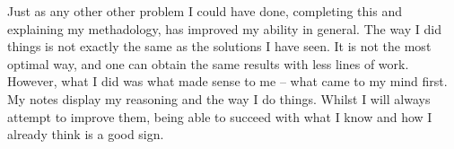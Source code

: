 \documentclass[a4paper]{article}
\begin{document}
Just as any other other problem I could have done, completing this and explaining my methadology, has improved my ability in general.
The way I did things is not exactly the same as the solutions I have seen.
It is not the most optimal way, and one can obtain the same results with less lines of work.
However, what I did was what made sense to me -- what came to my mind first.
My notes display my reasoning and the way I do things.
Whilst I will always attempt to improve them, being able to succeed with what I know and how I already think is a good sign.
\end{document}
